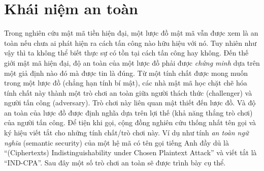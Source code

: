 \documentclass[class=report, crop=false]{standalone}
\begin{document}
	\section{Khái niệm an toàn}
		Trong nghiên cứu mật mã tiền hiện đại, một lược đồ mật mã vẫn được xem là an toàn nếu chưa ai phát hiện ra cách tấn công nào hữu hiệu với nó. Tuy nhiên như vậy thì ta không thể biết thực sự có tồn tại cách tấn công hay không. Đến thế giới mật mã hiện đại, độ an toàn của một lược đồ phải được \emph{chứng minh} dựa trên một giả định nào đó mà được tin là đúng. Từ một tính chất được mong muốn trong một lược đồ (chẳng hạn tính bí mật), các nhà mật mã học chặt chẽ hóa tính chất này thành một trò chơi an toàn giữa người thách thức (challenger) và người tấn công (adversary). Trò chơi này liên quan mật thiết đến lược đồ. Và độ an toàn của lược đồ được định nghĩa dựa trên lợi thế (khả năng thắng trò chơi) của người tấn công. Để tiện khi gọi, cộng đồng nghiên cứu thống nhất tên gọi và ký hiệu viết tắt cho những tính chất/trò chơi này. Ví dụ như tính \textit{an toàn ngữ nghĩa} (semantic security) của một hệ mã có tên gọi tiếng Anh đầy dủ là ``(Ciphertexts) Indistinguishability under Chosen Plaintext Attack'' và viết tắt là ``IND-CPA''. Sau đây một số trò chơi an toàn sẽ được trình bày cụ thể.
\end{document}
